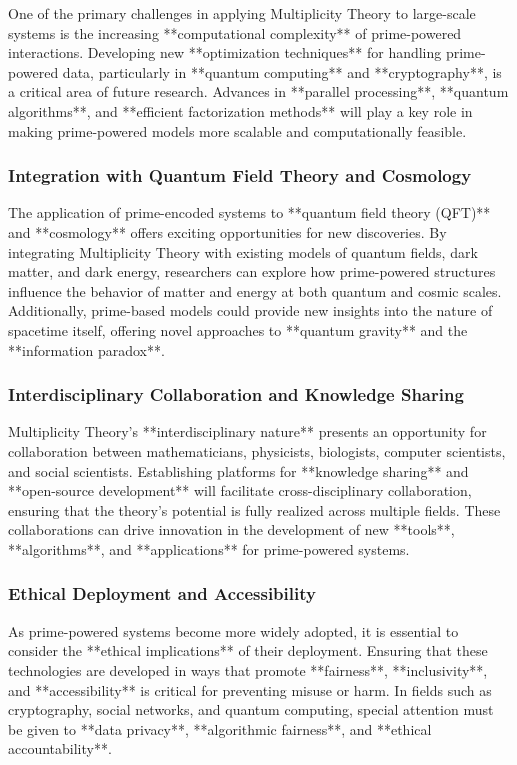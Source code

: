\documentclass[12pt]{article}
\begin{document}
One of the primary challenges in applying Multiplicity Theory to large-scale systems is the increasing **computational complexity** of prime-powered interactions. Developing new **optimization techniques** for handling prime-powered data, particularly in **quantum computing** and **cryptography**, is a critical area of future research. Advances in **parallel processing**, **quantum algorithms**, and **efficient factorization methods** will play a key role in making prime-powered models more scalable and computationally feasible.

\subsubsection{Integration with Quantum Field Theory and Cosmology}

The application of prime-encoded systems to **quantum field theory (QFT)** and **cosmology** offers exciting opportunities for new discoveries. By integrating Multiplicity Theory with existing models of quantum fields, dark matter, and dark energy, researchers can explore how prime-powered structures influence the behavior of matter and energy at both quantum and cosmic scales. Additionally, prime-based models could provide new insights into the nature of spacetime itself, offering novel approaches to **quantum gravity** and the **information paradox**.

\subsubsection{Interdisciplinary Collaboration and Knowledge Sharing}

Multiplicity Theory's **interdisciplinary nature** presents an opportunity for collaboration between mathematicians, physicists, biologists, computer scientists, and social scientists. Establishing platforms for **knowledge sharing** and **open-source development** will facilitate cross-disciplinary collaboration, ensuring that the theory's potential is fully realized across multiple fields. These collaborations can drive innovation in the development of new **tools**, **algorithms**, and **applications** for prime-powered systems.

\subsubsection{Ethical Deployment and Accessibility}

As prime-powered systems become more widely adopted, it is essential to consider the **ethical implications** of their deployment. Ensuring that these technologies are developed in ways that promote **fairness**, **inclusivity**, and **accessibility** is critical for preventing misuse or harm. In fields such as cryptography, social networks, and quantum computing, special attention must be given to **data privacy**, **algorithmic fairness**, and **ethical accountability**.
\end{document}

